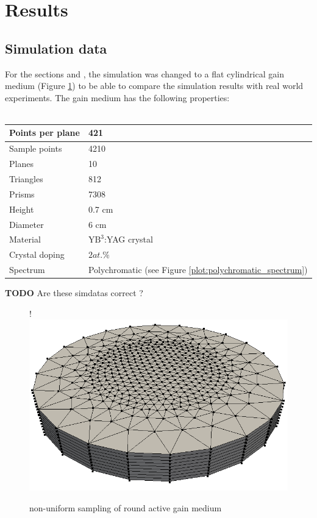 \section{Results}

\subsection{Simulation data}
For the sections  and ,
the simulation was changed to a flat cylindrical gain medium 
(Figure \ref{graphic:samples_round}) to be able to compare the simulation
results with real world experiments. The gain medium has the following
properties:
\\
\\ 
\begin{tabular}{| l | l |}
\hline
Points per plane        & 421\\
\hline
Sample points           & 4210\\
\hline
Planes                  & 10\\
\hline
Triangles               & 812\\
\hline
Prisms                  & 7308\\
\hline
Height                  & 0.7 cm\\
\hline
Diameter                & 6 cm\\
\hline
Material                & $\text{YB}^3$:YAG crystal\\
\hline
Crystal doping          & $2at.\%$\\
\hline
Spectrum                & Polychromatic (see Figure \ref{plot:polychromatic_spectrum})\\
\hline
\end{tabular}
\textbf{TODO} Are these simdatas correct ?\\

\begin{figure}[H]
  \centerline{
     {!} {\includegraphics{graphics/samples_round.png}}
  }
  \caption{non-uniform sampling of round active gain medium}
  \label{graphic:samples_round}
\end{figure}

